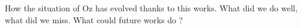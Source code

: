 
How the situation of Oz has evolved thanks to this works.
What did we do well, what did we miss.
What could future works do ?